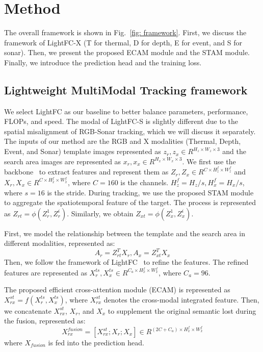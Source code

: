 \section{Method}
\label{sec:method}

The overall framework is shown in Fig.~\ref{fig: framework}. First, we discuss the framework of LightFC-X (T for thermal, D for depth, E for event, and S for sonar). Then, we present the proposed ECAM module  and the STAM module. Finally, we introduce the prediction head and the training loss.


\subsection{Lightweight MultiModal Tracking framework}
\label{method rgbs}



We select LightFC \cite{lightfc} as our baseline to better balance parameters, performance, FLOPs, and speed. The modal of LightFC-S is slightly different due to the spatial misalignment of RGB-Sonar tracking, which we will discuss it separately. The inputs of our method are the RGB and X modalities (Thermal, Depth, Event, and Sonar) template images represented as  $z_{r}, z_{x} \in R^{H_{z}\times W_{z}\times 3}$ and the search area images are represented as $x_{r}, x_{x} \in R^{H_{x}\times W_{x}\times 3}$. We first use the backbone~\cite{tinyvit} to extract features and represent them as $Z_{r}, Z_{x} \in R^{C \times H_{z}^{f}\times W_{z}^{f}}$ and $X_{r}, X_{x} \in R^{C \times H_{x}^{f}\times W_{x}^{f}}$, where $C=160$ is the channels. $H_{z}^{f}=H_{z}/s, H_{x}^{f}=H_{x}/s$, where $s=16$ is the stride. During tracking, we use the proposed STAM module to aggregate the spatiotemporal feature of the target. The process is represented as $Z_{rt}=\phi(Z_{r}^{1}, Z_{r}^{i})$. Similarly, we obtain $Z_{xt}=\phi(Z_{x}^{1}, Z_{x}^{i})$.

First, we model the relationship between the template and the search area in different modalities, represented as:
\begin{equation}
A_{r}=Z_{rt}^{T}X_{r}, A_{x}=Z_{xt}^{T}X_{x}
\end{equation}
Then, we follow the framework of LightFC~\cite{lightfc} to refine the features. The refined features are represented as $X_{r}^{ts}, X_{x}^{ts} \in R^{C_{a} \times H_{x}^{f}\times W_{x}^{f}}$, where $C_{a}=96$.

The proposed efficient cross-attention module (ECAM) is represented as $X_{rx}^{st}=f(X_{r}^{ts}, X_{x}^{ts})$, where $X_{rx}^{st}$ denotes the cross-modal integrated feature. Then, we concatenate $X_{rx}^{st}$, $X_{r}$, and $X_{x}$ to supplement the original semantic lost during the fusion, represented as:
\begin{equation}
X_{rx}^{fusion}=[X_{rx}^{st}; X_{r}; X_{x}] \in R^{(2C+C_{a})\times H_{x}^{f}\times W_{x}^{f}}
\end{equation}
where $X_{fusion}$ is fed into the prediction head.


